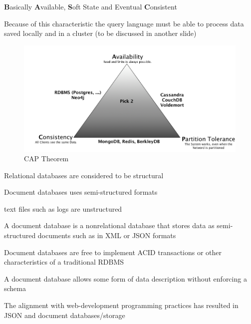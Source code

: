\documentclass{beamer}
\begin{document}
\begin{slide}{
\item \textbf{B}asically \textbf{A}vailable, \textbf{S}oft State
and  Eventual \textbf{C}onsistent \\
\item Because of this characteristic the query language must be able to process data saved locally and in a cluster (to be discussed in another slide)  
\begin{figure}
		\includegraphics[scale=0.25]{img/cap}
		\caption{CAP Theorem}
\end{figure}
}\end{slide}

\begin{slide}{
\item Relational databases are considered to be structural
\item Document databases uses semi-structured formats 
\item text files such as logs are unstructured
}\end{slide}


\begin{slide}{
\item A document database is a nonrelational database that stores data as semi-structured documents such as in XML or JSON formats
\item Document databases are free to implement ACID transactions or other characteristics of a traditional RDBMS
\item A document database allows some form of data description without enforcing a schema
\item The alignment with web-development programming practices has resulted in JSON and document databases/storage
}\end{slide}	
\end{document}
